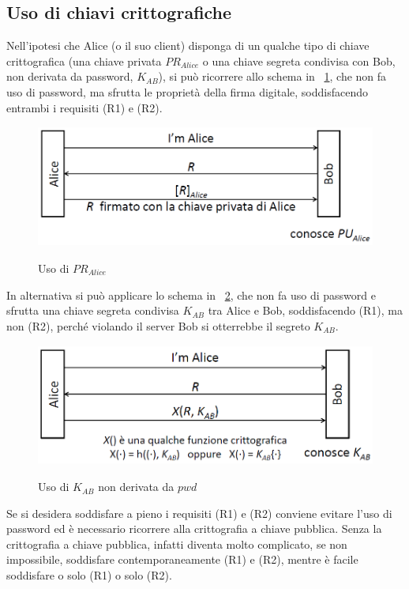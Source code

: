 \subsection{Uso di chiavi crittografiche}
\label{subsec:uso_chiavi_crittografiche}
Nell'ipotesi che Alice (o il suo client) disponga di un qualche tipo di chiave crittografica (una chiave privata $PR_{Alice}$ o una chiave segreta condivisa con Bob, non derivata da password, $K_{AB}$), si può ricorrere allo schema in \figurename~\ref{fig:ImgS45}, che non fa uso di password, ma sfrutta le proprietà della firma digitale, soddisfacendo entrambi i requisiti (R1) e (R2).
\begin{figure}[htbp]
	\centering%
	\subfigure%
	{\includegraphics[height=4cm, width=12cm, keepaspectratio]{Immagini/autenticazione/ImgS45.png}}
	\caption{Uso di $PR_{Alice}$\label{fig:ImgS45}} 	
\end{figure}
In alternativa si può applicare lo schema in \figurename~\ref{fig:ImgS46}, che non fa uso di password e sfrutta una chiave segreta condivisa $K_{AB}$ tra Alice e Bob, soddisfacendo (R1), ma non (R2), perché violando il server
Bob si otterrebbe il segreto $K_{AB}$.
\begin{figure}[htbp]
	\centering%
	\subfigure%
	{\includegraphics[height=4cm, width=12cm, keepaspectratio]{Immagini/autenticazione/ImgS46.png}}
	\caption{Uso di $K_{AB}$ non derivata da $pwd$\label{fig:ImgS46}} 	
\end{figure}

Se si desidera soddisfare a pieno i requisiti (R1) e (R2) conviene evitare l'uso di password ed è necessario ricorrere alla crittografia a chiave pubblica. Senza la crittografia a chiave pubblica, infatti diventa
molto complicato, se non impossibile, soddisfare contemporaneamente (R1) e (R2), mentre è facile soddisfare o solo (R1) o solo (R2).

